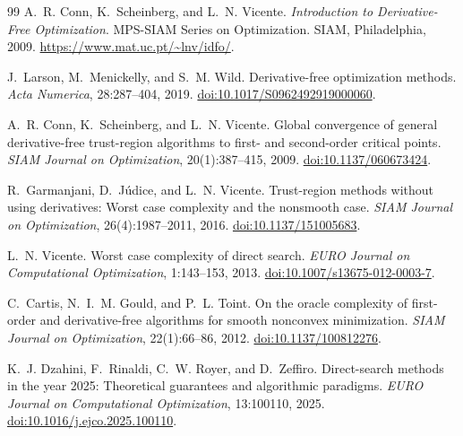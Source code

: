 \documentclass[11pt]{article}
\numberwithin{equation}{section}
\theoremstyle{definition}
\theoremstyle{remark}
\begin{document}
\begin{thebibliography}{99}
A.~R. Conn, K.~Scheinberg, and L.~N. Vicente.
\newblock \emph{Introduction to Derivative-Free Optimization}.
\newblock MPS-SIAM Series on Optimization. SIAM, Philadelphia, 2009.
\newblock \url{https://www.mat.uc.pt/~lnv/idfo/}.

J.~Larson, M.~Menickelly, and S.~M. Wild.
\newblock Derivative-free optimization methods.
\newblock \emph{Acta Numerica}, 28:287--404, 2019.
\newblock \href{https://doi.org/10.1017/S0962492919000060}{doi:10.1017/S0962492919000060}.

A.~R. Conn, K.~Scheinberg, and L.~N. Vicente.
\newblock Global convergence of general derivative-free trust-region algorithms to first- and second-order critical points.
\newblock \emph{SIAM Journal on Optimization}, 20(1):387--415, 2009.
\newblock \href{https://doi.org/10.1137/060673424}{doi:10.1137/060673424}.

R.~Garmanjani, D.~J\'udice, and L.~N. Vicente.
\newblock Trust-region methods without using derivatives: Worst case complexity and the nonsmooth case.
\newblock \emph{SIAM Journal on Optimization}, 26(4):1987--2011, 2016.
\newblock \href{https://doi.org/10.1137/151005683}{doi:10.1137/151005683}.

L.~N. Vicente.
\newblock Worst case complexity of direct search.
\newblock \emph{EURO Journal on Computational Optimization}, 1:143--153, 2013.
\newblock \href{https://doi.org/10.1007/s13675-012-0003-7}{doi:10.1007/s13675-012-0003-7}.

C.~Cartis, N.~I.~M. Gould, and P.~L. Toint.
\newblock On the oracle complexity of first-order and derivative-free algorithms for smooth nonconvex minimization.
\newblock \emph{SIAM Journal on Optimization}, 22(1):66--86, 2012.
\newblock \href{https://doi.org/10.1137/100812276}{doi:10.1137/100812276}.

K.~J. Dzahini, F.~Rinaldi, C.~W. Royer, and D.~Zeffiro.
\newblock Direct-search methods in the year 2025: Theoretical guarantees and algorithmic paradigms.
\newblock \emph{EURO Journal on Computational Optimization}, 13:100110, 2025.
\newblock \href{https://doi.org/10.1016/j.ejco.2025.100110}{doi:10.1016/j.ejco.2025.100110}.


\end{thebibliography}
\end{document}
